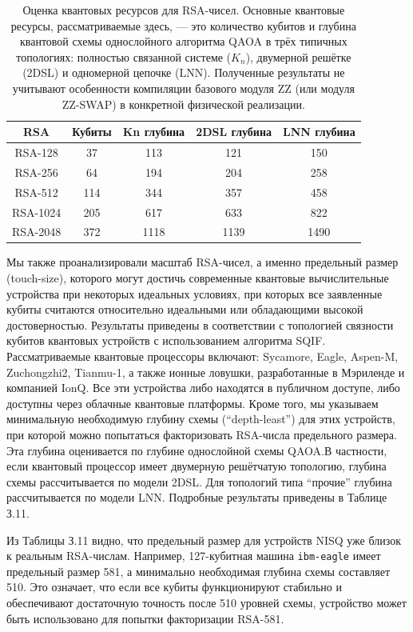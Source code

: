\begin{table}[H]
\centering
\caption{
    Оценка квантовых ресурсов для RSA-чисел. Основные квантовые ресурсы,
    рассматриваемые здесь, — это количество кубитов и глубина квантовой схемы
    однослойного алгоритма QAOA в трёх типичных топологиях: полностью связанной
    системе ($K_n$), двумерной решётке (2DSL) и одномерной цепочке (LNN).
    Полученные результаты не учитывают особенности компиляции базового модуля
    ZZ (или модуля ZZ-SWAP) в конкретной физической реализации.
}
\begin{tabular}{c|c|c|c|c}
\hline
\hline
\textbf{RSA } & \textbf{Кубиты} & \textbf{Kn глубина} & \textbf{2DSL глубина} & \textbf{LNN глубина} \\
\hline
RSA-128  &  37  & 113  & 121  & 150 \\
RSA-256  &  64  & 194  & 204  & 258 \\
RSA-512  & 114  & 344  & 357  & 458 \\
RSA-1024 & 205  & 617  & 633  & 822 \\
RSA-2048 & 372  & 1118 & 1139 & 1490 \\
\hline
\hline
\end{tabular}
\end{table}

Мы также проанализировали масштаб RSA-чисел, а именно предельный размер
(touch-size), которого могут достичь современные квантовые вычислительные
устройства при некоторых идеальных условиях, при которых все заявленные кубиты
считаются относительно идеальными или обладающими высокой достоверностью.
Результаты приведены в соответствии с топологией связности кубитов квантовых
устройств с использованием алгоритма SQIF. Рассматриваемые квантовые процессоры
включают: Sycamore, Eagle, Aspen-M, Zuchongzhi2, Tianmu-1, а также ионные
ловушки, разработанные в Мэриленде и компанией IonQ. Все эти устройства либо
находятся в публичном доступе, либо доступны через облачные квантовые
платформы. Кроме того, мы указываем минимальную необходимую глубину схемы
(``depth-least'') для этих устройств, при которой можно попытаться
факторизовать RSA-числа предельного размера. Эта глубина оценивается по глубине
однослойной схемы QAOA.В частности, если квантовый процессор имеет двумерную
решётчатую топологию, глубина схемы рассчитывается по модели 2DSL. Для
топологий типа ``прочие'' глубина рассчитывается по модели LNN. Подробные
результаты приведены в Таблице З.11.

Из Таблицы З.11 видно, что предельный размер для устройств NISQ уже близок к
реальным RSA-числам. Например, 127-кубитная машина \texttt{ibm-eagle} имеет
предельный размер 581, а минимально необходимая глубина схемы составляет 510.
Это означает, что если все кубиты функционируют стабильно и обеспечивают
достаточную точность после 510 уровней схемы, устройство может быть
использовано для попытки факторизации RSA-581.

